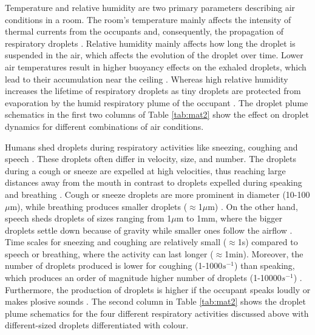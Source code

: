 \documentclass[a4paper,12pt]{elsarticle}
\begin{document}
Temperature and relative humidity are two primary parameters describing air conditions in a room. The room's temperature mainly affects the intensity of thermal currents from the occupants and, consequently, the propagation of respiratory droplets \cite{feng2020study}. Relative humidity mainly affects how long the droplet is suspended in the air, which affects the evolution of the droplet over time. Lower air temperatures result in higher buoyancy effects on the exhaled droplets, which lead to their accumulation near the ceiling \cite{zhang2019distribution}. Whereas high relative humidity increases the lifetime of respiratory droplets as tiny droplets are protected from evaporation by the humid respiratory plume of the occupant \cite{chong2021extended}. The droplet plume schematics in the first two columns of Table \ref{tab:mat2} show the effect on droplet dynamics for different combinations of air conditions.

Humans shed droplets during respiratory activities like sneezing, coughing and speech \cite{stadnytskyi2021breathing}. These droplets often differ in velocity, size, and number. The droplets during a cough or sneeze are expelled at high velocities, thus reaching large distances away from the mouth in contrast to droplets expelled during speaking and breathing \cite{pendar2020numerical,zhang2019distribution}. Cough or sneeze droplets are more prominent in diameter (10-100 $\mu$m), while breathing produces smaller droplets ($\approx$1$\mu$m) \cite{shao2021risk}. On the other hand, speech sheds droplets of sizes ranging from 1$\mu$m to 1mm, where the bigger droplets settle down because of gravity while smaller ones follow the airflow \cite{tan2021experimental}. Time scales for sneezing and coughing are relatively small ($\approx$1s) compared to speech or breathing, where the activity can last longer ($\approx$1min). Moreover, the number of droplets produced is lower for coughing (1-1000$s^{-1}$) than speaking, which produces an order of magnitude higher number of droplets (1-10000$s^{-1}$) \cite{giri2022colliding}. Furthermore, the production of droplets is higher if the occupant speaks loudly or makes plosive sounds \cite{abkarian2020speech}. The second column in Table \ref{tab:mat2} shows the droplet plume schematics for the four different respiratory activities discussed above with different-sized droplets differentiated with colour.
\end{document}
